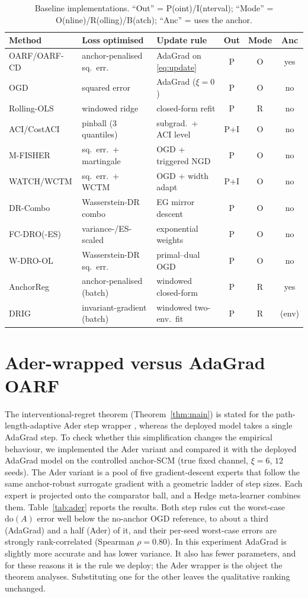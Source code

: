 \documentclass[11pt]{article}
\theoremstyle{plain}
\theoremstyle{remark}
\newcommand{\doop}{\mathrm{do}}
\newcommand{\OARF}{\textsc{OARF}}
\newcommand{\OARFCD}{\textsc{OARF-CD}}
\begin{document}
\begin{table}[htbp]
\centering
\caption{Baseline implementations. ``Out'' = P(oint)/I(nterval); ``Mode'' =
O(nline)/R(olling)/B(atch); ``Anc'' = uses the anchor.}
\label{tab:baseimpl}
\small
\begin{tabular}{lllccc}
\toprule
Method & Loss optimised & Update rule & Out & Mode & Anc\\
\midrule
\OARF{}/\OARFCD{} & anchor-penalised sq.\ err. & AdaGrad on \eqref{eq:update} & P & O & yes\\
OGD & squared error & AdaGrad ($\xi=0$) & P & O & no\\
Rolling-OLS & windowed ridge & closed-form refit & P & R & no\\
ACI/CostACI & pinball (3 quantiles) & subgrad.\ + ACI level & P+I & O & no\\
M-FISHER & sq.\ err.\ + martingale & OGD + triggered NGD & P & O & no\\
WATCH/WCTM & sq.\ err.\ + WCTM & OGD + width adapt & P+I & O & no\\
DR-Combo & Wasserstein-DR combo & EG mirror descent & P & O & no\\
FC-DRO(-ES) & variance-/ES-scaled & exponential weights & P & O & no\\
W-DRO-OL & Wasserstein-DR sq.\ err. & primal--dual OGD & P & O & no\\
AnchorReg & anchor-penalised (batch) & windowed closed-form & P & R & yes\\
DRIG & invariant-gradient (batch) & windowed two-env.\ fit & P & R & (env)\\
\bottomrule
\end{tabular}
\end{table}

\section{Ader-wrapped versus AdaGrad OARF}\label{app:ader}
The interventional-regret theorem (Theorem~\ref{thm:main}) is stated for the
path-length-adaptive Ader step wrapper \citep{zhang2018adaptive}, whereas the deployed
model takes a single AdaGrad step. To check whether this simplification changes the
empirical behaviour, we implemented the Ader variant and compared it with the deployed
AdaGrad model on the controlled anchor-SCM (true fixed channel, $\xi=6$, $12$ seeds).
The Ader variant is a pool of five gradient-descent experts that follow the same
anchor-robust surrogate gradient with a geometric ladder of step sizes. Each expert is
projected onto the comparator ball, and a Hedge meta-learner combines them.
Table~\ref{tab:ader} reports the results. Both step rules cut the worst-case $\doop(A)$ error well below the no-anchor OGD reference, to about a third (AdaGrad) and a half (Ader) of it, and their per-seed worst-case
errors are strongly rank-correlated (Spearman $\rho=0.80$). In this experiment AdaGrad
is slightly more accurate and has lower variance. It also has fewer parameters, and for
these reasons it is the rule we deploy; the Ader wrapper is the object the theorem
analyses. Substituting one for the other leaves the qualitative ranking unchanged.
\end{document}
